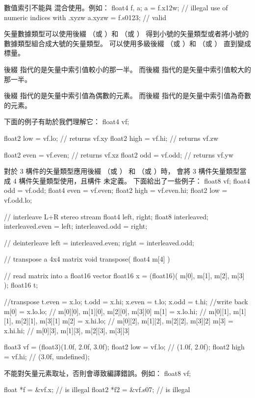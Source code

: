 數值索引不能與  混合使用。例如：
\startclc
float4 f, a;
a = f.x12w;	// illegal use of numeric indices with .xyzw
a.xyzw = f.s0123;	// valid
\stopclc

矢量數據類型可以使用後綴  （或 ）和  （或 ）
得到小號的矢量類型或者將小號的數據類型組合成大號的矢量類型。
可以使用多級後綴  （或 ）和  （或 ）
直到變成標量。

後綴  指代的是矢量中索引值較小的那一半。
而後綴  指代的是矢量中索引值較大的那一半。

後綴  指代的是矢量中索引值為偶數的元素。
而後綴  指代的是矢量中索引值為奇數的元素。

下面的例子有助於我們理解它：
\startclc
float4 vf;

float2 low = vf.lo;	// returns vf.xy
float2 high = vf.hi;	// returns vf.zw

float2 even = vf.even;	// returns vf.xz
float2 odd = vf.odd;	// returns vf.yw
\stopclc

對於 3 構件的矢量類型應用後綴  （或 ）
和  （或 ）時，
會將 3 構件矢量類型當成 4 構件矢量類型使用，且構件  未定義。
下面給出了一些例子：
\startclc
float8	vf;
float4	odd = vf.odd;
float4	even = vf.even;
float2	high = vf.even.hi;
float2	low = vf.odd.lo;

// interleave L+R stereo stream
float4	left, right;
float8	interleaved;
interleaved.even = left;
interleaved.odd = right;

// deinterleave
left = interleaved.even;
right = interleaved.odd;

// transpose a 4x4 matrix
void transpose( float4 m[4] )
{
	// read matrix into a float16 vector
	float16 x = (float16)( m[0], m[1], m[2], m[3] );
	float16 t;

	//transpose
	t.even = x.lo;
	t.odd = x.hi;
	x.even = t.lo;
	x.odd = t.hi;
	//write back
	m[0] = x.lo.lo;	// { m[0][0], m[1][0], m[2][0], m[3][0] }
	m[1] = x.lo.hi;	// { m[0][1], m[1][1], m[2][1], m[3][1] }
	m[2] = x.hi.lo;	// { m[0][2], m[1][2], m[2][2], m[3][2] }
	m[3] = x.hi.hi;	// { m[0][3], m[1][3], m[2][3], m[3][3] }
}

float3	vf = (float3)(1.0f, 2.0f, 3.0f);
float2	low = vf.lo; // (1.0f, 2.0f);
float2	high = vf.hi; // (3.0f, undefined);
\stopclc

不能對矢量元素取址，否則會導致編譯錯誤。例如：
\startclc
float8	vf;

float	*f = &vf.x;		// is illegal
float2	*f2 = &vf.s07;		// is illegal

